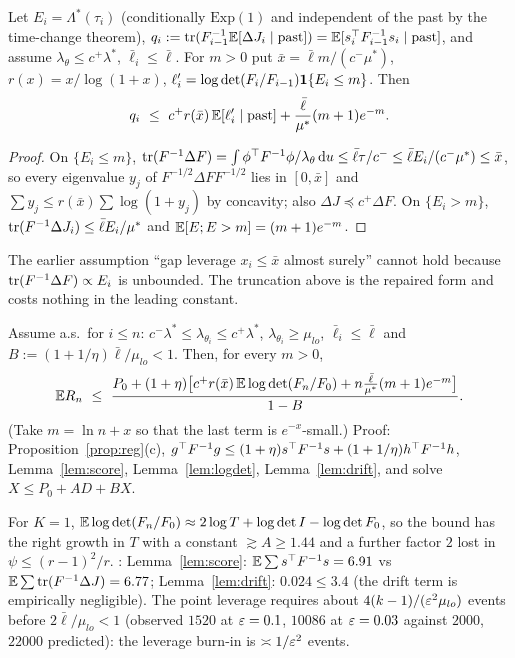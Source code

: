 \begin{lemma}\label{lem:logdet}\Pt{}
Let $E_i=\Lambda^*(\tau_i)$ (conditionally $\mathrm{Exp}(1)$ and independent of the past by the time-change theorem), $q_i:=\operatorname{tr}(F_{i-1}^{-1}\mathbb{E}[\Delta J_i\mid\text{past}])=\mathbb{E}[s_i^{\top} F_{i-1}^{-1}s_i\mid\text{past}]$, and assume $\lambda_\theta\le c^+\lambda^*$, $\bar\ell_i\le\bar\ell$. For $m>0$ put $\bar x=\bar\ell m/(c^-\mu^*)$, $r(x)=x/\log(1+x)$, $\ell'_i=\log\det(F_i/F_{i-1})\mathbf 1\{E_i\le m\}$. Then
\[
q_i\ \le\ c^+r(\bar x)\,\mathbb{E}[\ell'_i\mid\text{past}]+\frac{\bar\ell}{\mu^*}(m+1)e^{-m}.
\]
\end{lemma}
\begin{proof}
On $\{E_i\le m\}$, $\operatorname{tr}(F^{-1}\Delta F)=\int\phi^{\top} F^{-1}\phi/\lambda_\theta\,\mathrm d u\le\bar\ell\tau/c^-\le\bar\ell E_i/(c^-\mu^*)\le\bar x$, so every eigenvalue $y_j$ of $F^{-1/2}\Delta FF^{-1/2}$ lies in $[0,\bar x]$ and $\sum y_j\le r(\bar x)\sum\log(1+y_j)$ by concavity; also $\Delta J\preceq c^+\Delta F$. On $\{E_i>m\}$, $\operatorname{tr}(F^{-1}\Delta J_i)\le\bar\ell E_i/\mu^*$ and $\mathbb{E}[E;E>m]=(m+1)e^{-m}$.
\end{proof}
\begin{remark}
The earlier assumption ``gap leverage $x_i\le\bar x$ almost surely'' cannot hold because $\operatorname{tr}(F^{-1}\Delta F)\propto E_i$ is unbounded. The truncation above is the repaired form and costs nothing in the leading constant.
\end{remark}

\begin{theorem}\label{thm:cond}\Ps{}
Assume a.s.\ for $i\le n$: $c^-\lambda^*\le\lambda_{\theta_i}\le c^+\lambda^*$, $\lambda_{\theta_i}\ge\mu_{lo}$, $\bar\ell_i\le\bar\ell$ and $B:=(1+1/\eta)\bar\ell/\mu_{lo}<1$. Then, for every $m>0$,
\[
\E R_n\ \le\ \frac{P_0+(1+\eta)\big[c^+r(\bar x)\,\E\logdet(F_n/F_0)+n\frac{\bar\ell}{\mu^*}(m+1)e^{-m}\big]}{1-B}.
\]
(Take $m=\ln n+x$ so that the last term is $e^{-x}$-small.) Proof: Proposition~\ref{prop:reg}(c), $g^{\top} F^{-1}g\le(1+\eta)s^{\top} F^{-1}s+(1+1/\eta)h^{\top} F^{-1}h$, Lemma~\ref{lem:score}, Lemma~\ref{lem:logdet}, Lemma~\ref{lem:drift}, and solve $X\le P_0+AD+BX$.
\end{theorem}
For $K=1$, $\mathbb{E}\log\det(F_n/F_0)\approx2\log T+\log\det I-\log\det F_0$, so the bound has the right growth in $T$ with a constant $\gtrsim A\ge1.44$ and a further factor $2$ lost in $\psi\le(r-1)^2/r$.
\Nt{}: Lemma~\ref{lem:score}: $\mathbb{E}\sum s^{\top} F^{-1}s=6.91$ vs $\mathbb{E}\sum\operatorname{tr}(F^{-1}\Delta J)=6.77$; Lemma~\ref{lem:drift}: $0.024\le3.4$ (the drift term is empirically negligible).
The point leverage requires about $4(k-1)/(\varepsilon^2\mu_{lo})$ events before $2\bar\ell/\mu_{lo}<1$ (observed $1520$ at $\varepsilon=0.1$, $10086$ at $\varepsilon=0.03$ against $2000$, $22000$ predicted): the leverage burn-in is $\asymp1/\varepsilon^2$ events.

